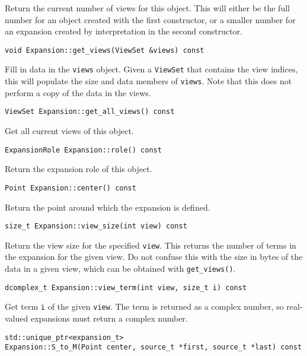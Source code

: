 \noindent Return the current number of views for this object. This will either
be the full number for an object created with the first constructor, or a
smaller number for an expansion created by interpretation in the second
constructor.

\begin{lstlisting}
void Expansion::get_views(ViewSet &views) const
\end{lstlisting}

\noindent Fill in data in the \texttt{views} object. Given a \texttt{ViewSet}
that contains the view indices, this will populate the size and data members
of \texttt{views}. Note that this does not perform a copy of the data in the
views.

\begin{lstlisting}
ViewSet Expansion::get_all_views() const
\end{lstlisting}

\noindent Get all current views of this object.

\begin{lstlisting}
ExpansionRole Expansion::role() const
\end{lstlisting}

\noindent Return the expansion role of this object.

\begin{lstlisting}
Point Expansion::center() const
\end{lstlisting}

\noindent Return the point around which the expansion is defined.

\begin{lstlisting}
size_t Expansion::view_size(int view) const
\end{lstlisting}

\noindent Return the view size for the specified \texttt{view}. This returns
the number of terms in the expansion for the given view. Do not confuse this
with the size in bytes of the data in a given view, which can be obtained with
\texttt{get\_views()}.

\begin{lstlisting}
dcomplex_t Expansion::view_term(int view, size_t i) const
\end{lstlisting}

\noindent Get term \texttt{i} of the given \texttt{view}. The term is returned
as a complex number, so real-valued expansions must return a complex number.

\begin{lstlisting}
std::unique_ptr<expansion_t>
Expansion::S_to_M(Point center, source_t *first, source_t *last) const
\end{lstlisting}

